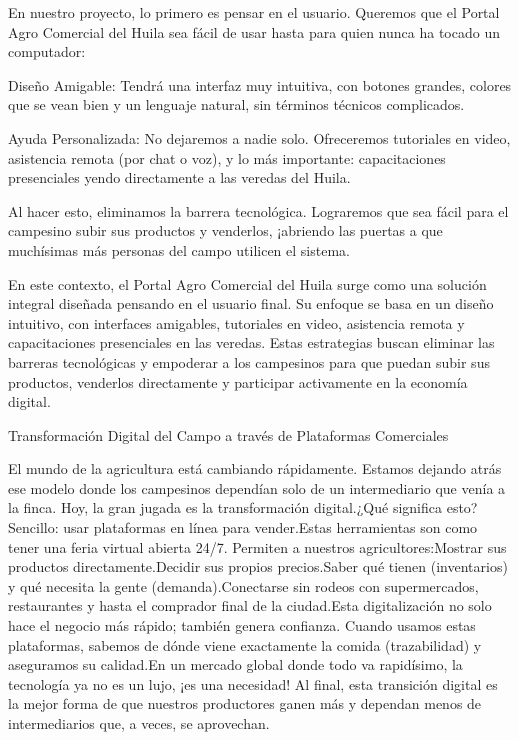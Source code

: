 En nuestro proyecto, lo primero es pensar en el usuario. Queremos que el Portal Agro Comercial del Huila sea fácil de usar hasta para quien nunca ha tocado un computador:

Diseño Amigable: Tendrá una interfaz muy intuitiva, con botones grandes, colores que se vean bien y un lenguaje natural, sin términos técnicos complicados.

Ayuda Personalizada: No dejaremos a nadie solo. Ofreceremos tutoriales en video, asistencia remota (por chat o voz), y lo más importante: capacitaciones presenciales yendo directamente a las veredas del Huila.

Al hacer esto, eliminamos la barrera tecnológica. Lograremos que sea fácil para el campesino subir sus productos y venderlos, ¡abriendo las puertas a que muchísimas más personas del campo utilicen el sistema.

En este contexto, el Portal Agro Comercial del Huila surge como una solución integral diseñada pensando en el usuario final. Su enfoque se basa en un diseño intuitivo, con interfaces amigables, tutoriales en video, asistencia remota y capacitaciones presenciales en las veredas. Estas estrategias buscan eliminar las barreras tecnológicas y empoderar a los campesinos para que puedan subir sus productos, venderlos directamente y participar activamente en la economía digital.

Transformación Digital del Campo a través de Plataformas Comerciales

El mundo de la agricultura está cambiando rápidamente. Estamos dejando atrás ese modelo donde los campesinos dependían solo de un intermediario que venía a la finca. Hoy, la gran jugada es la transformación digital.¿Qué significa esto? Sencillo: usar plataformas en línea para vender.Estas herramientas son como tener una feria virtual abierta 24/7. Permiten a nuestros agricultores:Mostrar sus productos directamente.Decidir sus propios precios.Saber qué tienen (inventarios) y qué necesita la gente (demanda).Conectarse sin rodeos con supermercados, restaurantes y hasta el comprador final de la ciudad.Esta digitalización no solo hace el negocio más rápido; también genera confianza. Cuando usamos estas plataformas, sabemos de dónde viene exactamente la comida (trazabilidad) y aseguramos su calidad.En un mercado global donde todo va rapidísimo, la tecnología ya no es un lujo, ¡es una necesidad! Al final, esta transición digital es la mejor forma de que nuestros productores ganen más y dependan menos de intermediarios que, a veces, se aprovechan.

